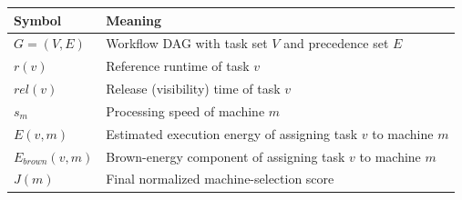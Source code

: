 \begin{tabular}{ll}
\hline
Symbol & Meaning \\
\hline
$G=(V,E)$ & Workflow DAG with task set $V$ and precedence set $E$ \\
$r(v)$ & Reference runtime of task $v$ \\
$rel(v)$ & Release (visibility) time of task $v$ \\
$s_m$ & Processing speed of machine $m$ \\
$E(v,m)$ & Estimated execution energy of assigning task $v$ to machine $m$ \\
$E_{brown}(v,m)$ & Brown-energy component of assigning task $v$ to machine $m$ \\
$J(m)$ & Final normalized machine-selection score \\
\hline
\end{tabular}
